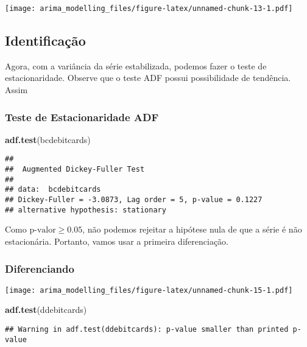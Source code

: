 \documentclass[]{article}
\newenvironment{Shaded}{\begin{snugshade}}{\end{snugshade}}
\newcommand{\KeywordTok}[1]{\textcolor[rgb]{0.13,0.29,0.53}{\textbf{#1}}}
\newcommand{\NormalTok}[1]{#1}
\begin{document}
\texttt{[image: arima\_modelling\_files/figure-latex/unnamed-chunk-13-1.pdf]}

\hypertarget{identificauxe7uxe3o-1}{%
\subsection{Identificação}\label{identificauxe7uxe3o-1}}

Agora, com a variância da série estabilizada, podemos fazer o teste de
estacionaridade. Observe que o teste ADF possui possibilidade de
tendência. Assim

\hypertarget{teste-de-estacionaridade-adf-1}{%
\subsubsection{Teste de Estacionaridade
ADF}\label{teste-de-estacionaridade-adf-1}}

\begin{Shaded}
\begin{Highlighting}[]
\KeywordTok{adf.test}\NormalTok{(bcdebitcards)}
\end{Highlighting}
\end{Shaded}

\begin{verbatim}
## 
##  Augmented Dickey-Fuller Test
## 
## data:  bcdebitcards
## Dickey-Fuller = -3.0873, Lag order = 5, p-value = 0.1227
## alternative hypothesis: stationary
\end{verbatim}

Como \(\text{p-valor} \ge 0.05\), não podemos rejeitar a hipótese nula
de que a série é não estacionária. Portanto, vamos usar a primeira
diferenciação.

\hypertarget{diferenciando-1}{%
\subsubsection{Diferenciando}\label{diferenciando-1}}

\texttt{[image: arima\_modelling\_files/figure-latex/unnamed-chunk-15-1.pdf]}

\begin{Shaded}
\begin{Highlighting}[]
\KeywordTok{adf.test}\NormalTok{(ddebitcards)}
\end{Highlighting}
\end{Shaded}

\begin{verbatim}
## Warning in adf.test(ddebitcards): p-value smaller than printed p-value
\end{verbatim}
\end{document}
